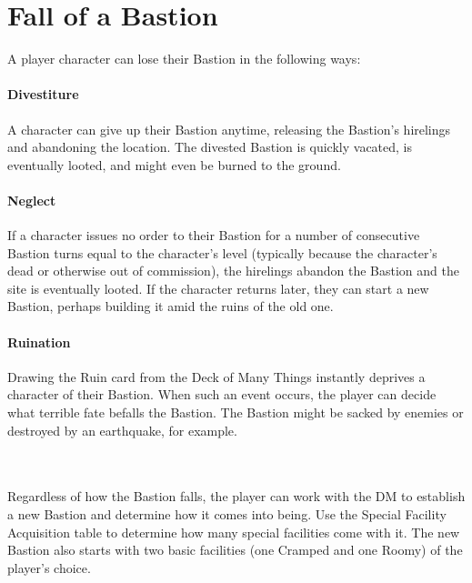 %
\vfill\eject
\section*{Fall of a Bastion}
{\entryfont A player character can lose their Bastion in the following ways:}\\
{\entryfont\paragraph*{Divestiture} A character can give up their Bastion anytime, releasing the Bastion's hirelings and abandoning the location. The divested Bastion is quickly vacated, is eventually looted, and might even be burned to the ground.}

{\entryfont\paragraph*{Neglect} If a character issues no order to their Bastion for a number of consecutive Bastion turns equal to the character's level (typically because the character's dead or otherwise out of commission), the hirelings abandon the Bastion and the site is eventually looted. If the character returns later, they can start a new Bastion, perhaps building it amid the ruins of the old one.}

{\entryfont\paragraph*{Ruination} Drawing the Ruin card from the Deck of Many Things instantly deprives a character of their Bastion. When such an event occurs, the player can decide what terrible fate befalls the Bastion. The Bastion might be sacked by enemies or destroyed by an earthquake, for example.}\\\\
{\entryfont Regardless of how the Bastion falls, the player can work with the DM to establish a new Bastion and determine how it comes into being. Use the Special Facility Acquisition table to determine how many special facilities come with it. The new Bastion also starts with two basic facilities (one Cramped and one Roomy) of the player's choice.}